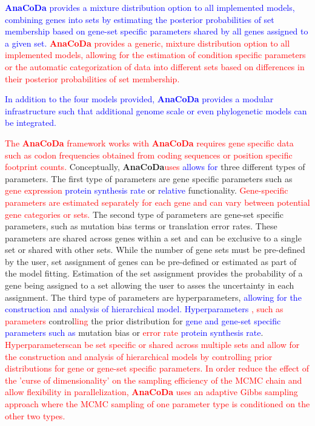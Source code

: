\documentclass{bioinfo}
\newcommand{\package}{\textbf{AnaCoDa}\xspace} %
\begin{document}
\textcolor{blue}{
\package provides a mixture distribution option to all implemented models, combining genes into sets by estimating the posterior probabilities of set membership based on gene-set specific parameters shared by all genes assigned to a given set. 
}
\textcolor{red}{
\package provides a generic, mixture distribution option to all implemented models, allowing for the estimation of condition specific parameters or the automatic categorization of data into different sets based on differences in their posterior probabilities of set membership.
}

\textcolor{blue}
{
In addition to the four models provided, \package provides a modular infrastructure such that additional genome scale or even phylogenetic models can be integrated.
}

\textcolor{red}
{
The \package framework works with \package requires gene specific data such as codon frequencies obtained from coding sequences or position specific footprint counts.
}
Conceptually, \package \textcolor{red}{uses} \textcolor{blue}{allows for} three different types of parameters.
The first type of parameters are gene specific parameters such as \textcolor{red}{gene expression} \textcolor{blue}{protein synthesis rate} or \textcolor{blue}{relative} functionality.
\textcolor{red}{Gene-specific parameters are estimated separately for each gene and can vary between potential gene categories or sets.}
The second type of parameters are gene-set specific parameters, such as mutation bias terms or translation error rates.
These parameters are shared across genes within a set and can be exclusive to a single set or shared with other sets.
While the number of gene sets must be pre-defined by the user, set assignment of genes can be pre-defined or estimated as part of the model fitting.
Estimation of the set assignment provides the probability of a gene being assigned to a set allowing the user to asses the uncertainty in each assignment.
The third type of parameters are hyperparameters, \textcolor{blue}{allowing for the construction and analysis of hierarchical model. Hyperparameters } \textcolor{red}{, such as parameters} control\textcolor{red}{ling} the prior distribution for \textcolor{blue}{gene and gene-set specific parameters such as} mutation bias or \textcolor{red}{error rate} \textcolor{blue}{protein synthesis rate}.
 \textcolor{red}{Hyperparameterscan be set specific or shared across multiple sets and allow for the construction and analysis of hierarchical models by controlling prior distributions for gene or gene-set specific parameters.
In order reduce the effect of the 'curse of dimensionality' on the sampling efficiency of the MCMC chain and allow flexibility in parallelization, \package uses an adaptive Gibbs sampling approach where the MCMC sampling of one parameter type is conditioned on the other two types.}
\end{document}
